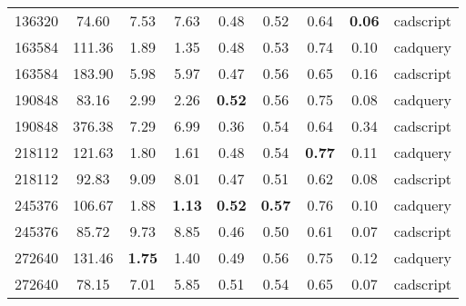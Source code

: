 \begin{table}[ht]
\begin{tabular}{c c c c c c c c c}
		136320              & 74.60                  & 7.53                   & 7.63                    & 0.48                    & 0.52                    & 0.64                     & \textbf{0.06}         & cadscript \\
		163584              & 111.36                 & 1.89                   & 1.35                    & 0.48                    & 0.53                    & 0.74                     & 0.10                  & cadquery  \\
		163584              & 183.90                 & 5.98                   & 5.97                    & 0.47                    & 0.56                    & 0.65                     & 0.16                  & cadscript \\
		190848              & 83.16                  & 2.99                   & 2.26                    & \textbf{0.52}           & 0.56                    & 0.75                     & 0.08                  & cadquery  \\
		190848              & 376.38                 & 7.29                   & 6.99                    & 0.36                    & 0.54                    & 0.64                     & 0.34                  & cadscript \\
		218112              & 121.63                 & 1.80                   & 1.61                    & 0.48                    & 0.54                    & \textbf{0.77}            & 0.11                  & cadquery  \\
		218112              & 92.83                  & 9.09                   & 8.01                    & 0.47                    & 0.51                    & 0.62                     & 0.08                  & cadscript \\
		245376              & 106.67                 & 1.88                   & \textbf{1.13}           & \textbf{0.52}           & \textbf{0.57}           & 0.76                     & 0.10                  & cadquery  \\
		245376              & 85.72                  & 9.73                   & 8.85                    & 0.46                    & 0.50                    & 0.61                     & 0.07                  & cadscript \\
		272640              & 131.46                 & \textbf{1.75}          & 1.40                    & 0.49                    & 0.56                    & 0.75                     & 0.12                  & cadquery  \\
		272640              & 78.15                  & 7.01                   & 5.85                    & 0.51                    & 0.54                    & 0.65                     & 0.07                  & cadscript \\
		\hline
	\end{tabular}
\end{table}

